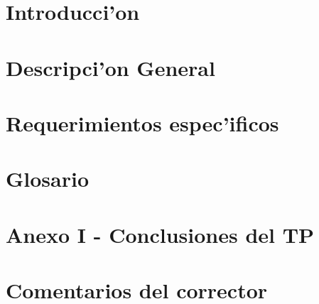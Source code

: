 \documentclass[spanish, a4paper, 10pt, titlepage]{article}
\author{Echevarr'ia - Farjat - Freijo - Giusto}
\begin{document}

\tableofcontents
\clearpage


\section{Introducci'on}

\clearpage

\section{Descripci'on General	}

\clearpage

\section{Requerimientos espec'ificos}

\clearpage

\section{Glosario}

\clearpage


\appendix

\section{Anexo I - Conclusiones del TP}

\clearpage

\section{Comentarios del corrector}
\end{document}
